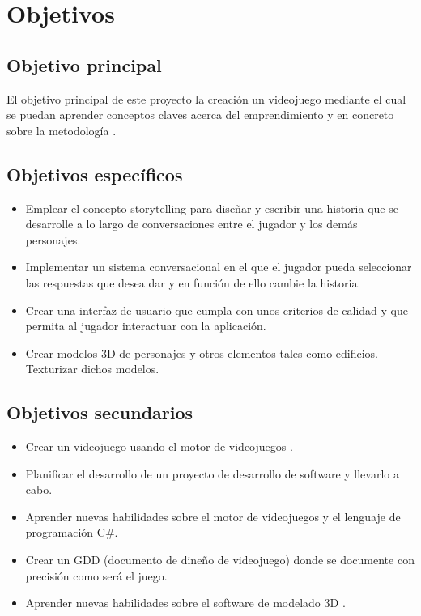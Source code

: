 \chapter{Objetivos}

\section{Objetivo principal}

El objetivo principal de este proyecto la creación un videojuego mediante el cual se puedan aprender conceptos claves acerca del emprendimiento y en concreto sobre la metodología .


\section{Objetivos específicos}

\begin{itemize}
	\item Emplear el concepto storytelling para diseñar y escribir una historia que se desarrolle a lo largo de conversaciones entre el jugador y los demás personajes.
	\item Implementar un sistema conversacional en el que el jugador pueda seleccionar las respuestas que desea dar y en función de ello cambie la historia.
	\item Crear una interfaz de usuario que cumpla con unos criterios de calidad y que permita al jugador interactuar con la aplicación.
	\item Crear modelos 3D de personajes y otros elementos tales como edificios. Texturizar dichos modelos.
\end{itemize}


\section{Objetivos secundarios}

\begin{itemize}
	\item Crear un videojuego usando el motor de videojuegos .
	\item Planificar el desarrollo de un proyecto de desarrollo de software y llevarlo a cabo.
	\item Aprender nuevas habilidades sobre el motor de videojuegos  y el lenguaje de programación C\#.
	\item Crear un GDD (documento de dineño de videojuego) donde se documente con precisión como será el juego.
	\item Aprender nuevas habilidades sobre el software de modelado 3D .

\end{itemize}



